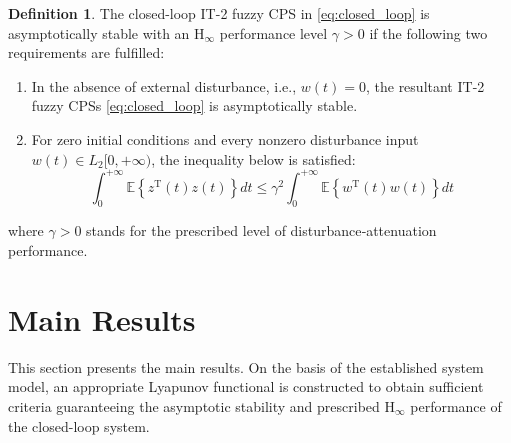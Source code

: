 \documentclass[preprint,review,fleqn,sort&compress,3p]{elsarticle}
\theoremstyle{definition} %
\theoremstyle{definition}%
\newtheorem{Def}{Definition}[section]
\begin{document}
\begin{Def}\label{Def1}
	The closed-loop IT-2 fuzzy CPS in \eqref{eq:closed_loop} is asymptotically stable with an $\mathrm{H}_\infty$ performance level $\gamma>0$ if the following two requirements are fulfilled:
	
	\begin{enumerate}
		\item In the absence of external disturbance, i.e., $w(t)=0$, the resultant IT-2 fuzzy CPSs \eqref{eq:closed_loop} is asymptotically stable.
		
		\item For zero initial conditions and every nonzero disturbance input $w(t)\in L_2[0,+\infty)$, the inequality below is satisfied:
		\begin{equation}
			\int_0^{+\infty}
			\mathbb E\left\{
			z^\mathrm{T}(t)z(t)
			\right\}dt
			\le
			\gamma^2
			\int_0^{+\infty}
			\mathbb E\left\{
			w^\mathrm{T}(t)w(t)
			\right\}dt
		\end{equation}
	\end{enumerate}
	where $\gamma>0$ stands for the prescribed level of disturbance‑attenuation performance.

\end{Def}

\section{Main Results}\label{sec3}
This section presents the main results. On the basis of the established system model, an appropriate Lyapunov functional is constructed to obtain sufficient criteria guaranteeing the asymptotic stability and prescribed $\mathrm{H}_\infty$ performance of the closed-loop system.
\end{document}
